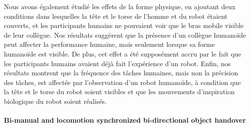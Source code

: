 Nous avons également étudié les effets de la forme physique, en ajoutant deux conditions dans lesquelles la tête et le torse de l'homme et du robot étaient couverts, et les participants humains ne pouvaient voir que le bras mobile visible de leur collègue. Nos résultats suggèrent que la présence d'un collègue humanoïde peut affecter la performance humaine, mais seulement lorsque sa forme humanoïde est visible. De plus, cet effet a été supposément accru par le fait que les participants humains avaient déjà fait l'expérience d'un robot. Enfin, nos résultats montrent que la fréquence des tâches humaines, mais non la précision des tâches, est affectée par l'observation d'un robot humanoïde, à condition que la tête et le torse du robot soient visibles et que les mouvements d'inspiration biologique du robot soient réalisés.



\paragraph*{\LARGE {Bi-manual and locomotion synchronized bi-directional object handover \\}\\}

